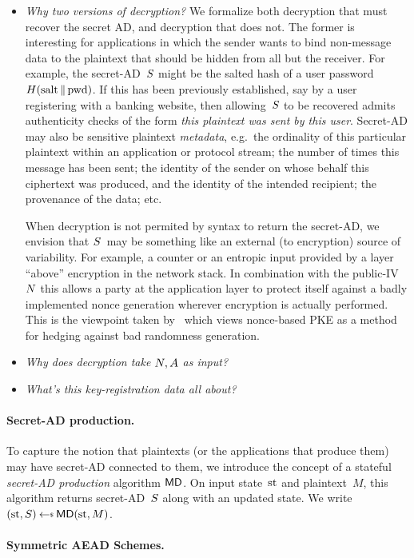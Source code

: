 \begin{itemize}
\item\emph{Why two versions of decryption?}  We formalize both decryption that must recover the secret AD, and decryption that does not.  The former is interesting for applications in which the sender wants to bind non-message data to the plaintext that should be hidden from all but the receiver.  For example, the secret-AD~$S$ might be the salted hash of a user password $H(\mathrm{salt} \,\|\, \mathrm{pwd})$.  If this has been previously established, say by a user registering with a banking website, then allowing~$S$ to be recovered admits authenticity checks of the form \emph{this plaintext was sent by this user}.  Secret-AD may also be sensitive plaintext \emph{metadata}, e.g.\ the ordinality of this particular plaintext within an application or protocol stream; the number of times this message has been sent; the identity of the sender on whose behalf this ciphertext was produced, and the identity of the intended recipient; the provenance of the data; etc. 

When decryption is not permited by syntax to return the secret-AD, we envision that $S$~may be something like an external (to encryption) source of variability.  For example, a counter or an entropic input provided by a layer ``above'' encryption in the network stack.  In combination with the public-IV~$N$ this allows a party at the application layer to protect itself against a badly implemented nonce generation wherever encryption is actually performed.  
This is the viewpoint taken by~\cite{mihir} which views nonce-based PKE as a method for hedging against bad randomness generation.

\item\emph{Why does decryption take $N,A$ as input?} 

\item\emph{What's this key-registration data all about?} 
\end{itemize}
 

\paragraph{Secret-AD production. } To capture the notion that plaintexts (or the applications that produce them) may have secret-AD connected to them, we introduce the concept of a stateful \emph{secret-AD production} algorithm $\mathsf{MD}$.  On input state~$\mathrm{st}$ and plaintext~$M$, this algorithm returns secret-AD~$S$ along with an updated state.  We write $(\st,S) \getsr \mdalg(\st,M)$.  


\paragraph{Symmetric AEAD Schemes. } 


